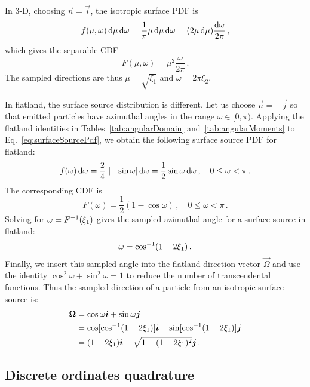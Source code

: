 In 3-D, choosing $\vec{n}=\vec{i}$, the isotropic surface PDF is
\begin{equation*}
  f(\mu,\omega) \mathop{}\!\mathrm{d}\mu \mathop{}\!\mathrm{d}\omega
  = \frac{1}{\pi} \mu \mathop{}\!\mathrm{d}\mu \mathop{}\!\mathrm{d}\omega
  = (2 \mu \mathop{}\!\mathrm{d}\mu) \frac{\mathop{}\!\mathrm{d}\omega}{2\pi}\,,
\end{equation*}
which gives the separable CDF
\begin{equation*}
  F(\mu,\omega) = \mu^2 \frac{\omega}{2\pi}\,.
\end{equation*}
The sampled directions are thus $\mu=\sqrt{\xi_1}$ and $\omega=2\pi \xi_2$.

In flatland, the surface source distribution is different. Let us choose
$\vec{n} = -\vec{j}$ so that emitted particles have azimuthal angles in the range
$\omega \in [0, \pi)$.
Applying the flatland identities in Tables~\ref{tab:angularDomain}
and~\ref{tab:angularMoments} to Eq.~\eqref{eq:surfaceSourcePdf}, we obtain
the following surface source PDF for flatland:
\begin{equation*}
  f(\omega) \mathop{}\!\mathrm{d}\omega = \frac{2}{4} \, \left|  -\sin \omega \right|\mathop{}\!\mathrm{d}\omega
  = \frac{1}{2} \sin \omega\mathop{}\!\mathrm{d}\omega \,,\quad 0 \le \omega < \pi\,.
\end{equation*}
The corresponding CDF is
\begin{equation}\label{eq:surfaceSourceFlatland}
  F(\omega) = \frac{1}{2} \left( 1-\cos\omega \right)
  \,,\quad 0 \le \omega < \pi\,.
\end{equation}
Solving for $\omega = F^{-1}(\xi_1)$ gives the sampled azimuthal angle for a surface source
in flatland:
\begin{equation*}
  \omega = \cos^{-1}(1 - 2\xi_1)\,.
\end{equation*}
Finally, we insert this sampled angle into the flatland
direction vector $\vec{\Omega}$ and use the identity
$\cos^2 \omega + \sin^2 \omega = 1$ to reduce the number of transcendental
functions. Thus the sampled direction of a particle from an isotropic surface
source is:
\begin{align*}
  \bm{\Omega} &= \cos \omega \bm{i} + \sin \omega \bm{j} \\
  &=  \cos[ \cos^{-1}(1 - 2\xi_1) ] \bm{i} + \sin[ \cos^{-1}(1 - 2\xi_1) ] \bm{j} \\
  &= (1 - 2\xi_1) \bm{i} + \sqrt{1 - (1 - 2\xi_1)^2} \bm{j}\,.
\end{align*}

\subsection{Discrete ordinates quadrature}\label{sec:flatlandQuadrature}

